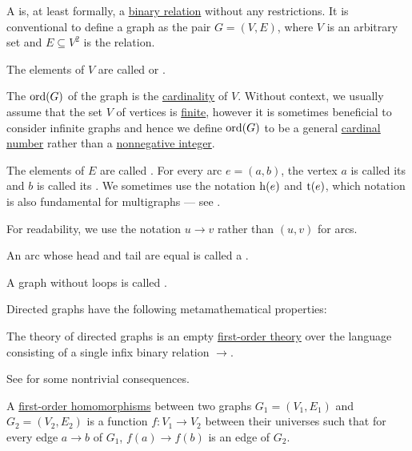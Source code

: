 \begin{definition}\label{def:directed_graph}
  A  is, at least formally, a \hyperref[def:binary_relation]{binary relation} without any restrictions. It is conventional to define a graph as the pair \( G = (V, E) \), where \( V \) is an arbitrary set and \( E \subseteq V^2 \) is the relation.

  \begin{thmenum}[series=def:directed_graph]
     The elements of \( V \) are called  or .

     The  \( \operatorname{ord}(G) \) of the graph is the \hyperref[thm:cardinality_existence]{cardinality} of \( V \). Without context, we usually assume that the set \( V \) of vertices is \hyperref[def:set_finiteness]{finite}, however it is sometimes beneficial to consider infinite graphs and hence we define \( \operatorname{ord}(G) \) to be a general \hyperref[def:cardinal]{cardinal number} rather than a \hyperref[rem:peano_arithmetic_zero/nonnegative]{nonnegative integer}.

     The elements of \( E \) are called . For every arc \( e = (a, b) \), the vertex \( a \) is called its  and \( b \) is called its . We sometimes use the notation \( \operatorname{h}(e) \) and \( \operatorname{t}(e) \), which notation is also fundamental for multigraphs --- see .

    For readability, we use the notation \( u \to v \) rather than \( (u, v) \) for arcs.

     An arc whose head and tail are equal is called a .

     A graph without loops is called .
  \end{thmenum}

  Directed graphs have the following metamathematical properties:
  \begin{thmenum}[resume=def:directed_graph]
     The theory of directed graphs is an empty \hyperref[def:first_order_theory]{first-order theory} over the language consisting of a single infix binary relation \( \to \).

    See  for some nontrivial consequences.

     A \hyperref[def:first_order_homomorphism]{first-order homomorphisms} between two graphs \( G_1 = (V_1, E_1) \) and \( G_2 = (V_2, E_2) \) is a function \( f: V_1 \to V_2 \) between their universes such that for every edge \( a \to b \) of \( G_1 \), \( f(a) \to f(b) \) is an edge of \( G_2 \).


\end{thmenum}
\end{definition}
